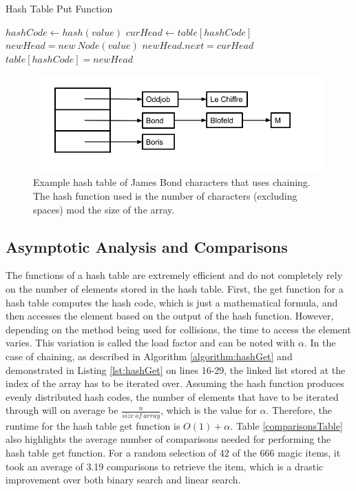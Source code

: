 \documentclass[letterpaper, 10pt,DIV=13]{scrartcl}
\numberwithin{equation}{section} %
\numberwithin{figure}{section} %
\numberwithin{table}{section} %
\begin{document}
\begin{algorithm}
  \caption{Hash Table Put Function}
  \label{algorithm:hashPut}
  \begin{algorithmic}[1]
        \State $hashCode \gets hash(value)$ 
        \State $curHead \gets table[hashCode]$ 
        \State $newHead = new~Node(value)$ 
          \State $newHead.next = curHead$ 
        \EndIf
        \State $table[hashCode] = newHead$ 
      \EndProcedure
  \end{algorithmic}
\end{algorithm}

\begin{figure}[ht] 
  \centering 
  \includegraphics[width=15cm]{hashing}
  \caption{Example hash table of James Bond characters that uses chaining. The hash function used is the number of characters (excluding spaces) mod the size of the array.}
  \label{figure:hashing}
\end{figure}

\subsection{Asymptotic Analysis and Comparisons}
The functions of a hash table are extremely efficient and do not completely rely on the number of elements stored in the hash table. First, the get function for a hash table computes the hash code, which is just a mathematical formula, and then accesses the element based on the output of the hash function. However, depending on the method being used for collisions, the time to access the element varies. This variation is called the load factor and can be noted with $\alpha$. In the case of chaining, as described in Algorithm \ref{algorithm:hashGet} and demonstrated in Listing \ref{lst:hashGet} on lines 16-29, the linked list stored at the index of the array has to be iterated over. Assuming the hash function produces evenly distributed hash codes, the number of elements that have to be iterated through will on average be $\frac{n}{size~of~array}$, which is the value for $\alpha$. Therefore, the runtime for the hash table get function is $O(1) + \alpha$. Table \ref{comparisonsTable} also highlights the average number of comparisons needed for performing the hash table get function. For a random selection of 42 of the 666 magic items, it took an average of 3.19 comparisons to retrieve the item, which is a drastic improvement over both binary search and linear search.
\end{document}
